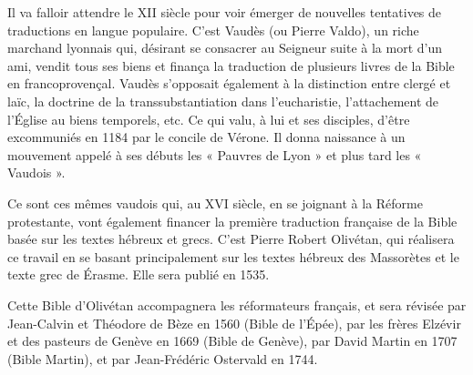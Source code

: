 \begin{small}
Il va falloir attendre le XII siècle pour voir émerger de nouvelles tentatives de traductions en langue populaire. C'est Vaudès (ou Pierre Valdo), un riche marchand lyonnais qui, désirant se consacrer au Seigneur suite à la mort d'un ami, vendit tous ses biens et finança la traduction de plusieurs livres de la Bible en francoprovençal. Vaudès s'opposait également à la distinction entre clergé et laïc, la doctrine de la transsubstantiation dans l'eucharistie, l'attachement de l'Église au biens temporels, etc. Ce qui valu, à lui et ses disciples, d'être excommuniés en 1184 par le concile de Vérone. Il donna naissance à un mouvement appelé à ses débuts les « Pauvres de Lyon » et plus tard les « Vaudois ».\bigskip

Ce sont ces mêmes vaudois qui, au XVI siècle, en se joignant à la Réforme protestante, vont également financer la première traduction française de la Bible basée sur les textes hébreux et grecs. C'est Pierre Robert Olivétan, qui réalisera ce travail en se basant principalement sur les textes hébreux des Massorètes et le texte grec de Érasme. Elle sera publié en 1535.\bigskip

Cette Bible d'Olivétan accompagnera les réformateurs français, et sera révisée par Jean-Calvin et Théodore de Bèze en 1560 (Bible de l'Épée), par les frères Elzévir et des pasteurs de Genève en 1669 (Bible de Genève), par David Martin en 1707 (Bible Martin), et par Jean-Frédéric Ostervald en 1744.
\end{small}
